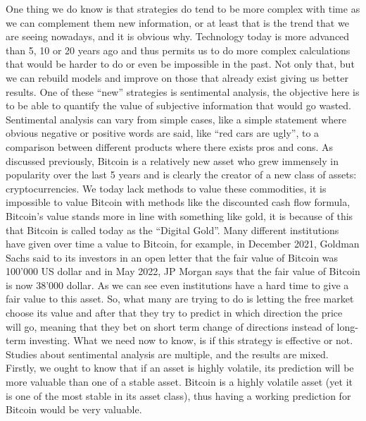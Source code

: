\documentclass[conference]{IEEEtran}
\begin{document}
\newline
One thing we do know is that strategies do tend to be more complex with time as we can complement them new information, or at least that is the trend that we are seeing nowadays, and it is obvious why. Technology today is more advanced than 5, 10 or 20 years ago and thus permits us to do more complex calculations that would be harder to do or even be impossible in the past. Not only that, but we can rebuild models and improve on those that already exist giving us better results.\newline
\newline
One of these “new” strategies is sentimental analysis, the objective here is to be able to quantify the value of subjective information that would go wasted. Sentimental analysis can vary from simple cases, like a simple statement where obvious negative or positive words are said, like “red cars are ugly”, to a comparison between different products where there exists pros and cons.  \newline
\newline
As discussed previously, Bitcoin is a relatively new asset who grew immensely in popularity over the last 5 years and is clearly the creator of a new class of assets: cryptocurrencies. We today lack methods to value these commodities, it is impossible to value Bitcoin with methods like the discounted cash flow formula, Bitcoin’s value stands more in line with something like gold, it is because of this that Bitcoin is called today as the “Digital Gold”.\newline
\newline
Many different institutions have given over time a value to Bitcoin, for example, in December 2021, Goldman Sachs said to its investors in an open letter that the fair value of Bitcoin was 100’000 US dollar and in May 2022, JP Morgan says that the fair value of Bitcoin is now 38’000 dollar. As we can see even institutions have a hard time to give a fair value to this asset. So, what many are trying to do is letting the free market choose its value and after that they try to predict in which direction the price will go, meaning that they bet on short term change of directions instead of long-term investing.\newline
\newline
What we need now to know, is if this strategy is effective or not. Studies about sentimental analysis are multiple, and the results are mixed. Firstly, we ought to know that if an asset is highly volatile, its prediction will be more valuable than one of a stable asset. Bitcoin is a highly volatile asset (yet it is one of the most stable in its asset class), thus having a working prediction for Bitcoin would be very valuable.
\end{document}
